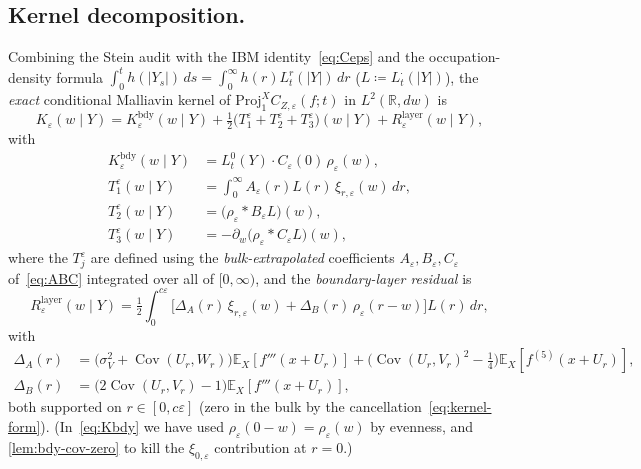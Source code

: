 \documentclass[11pt,reqno]{amsart}
\theoremstyle{plain}
\theoremstyle{definition}
\theoremstyle{remark}
\newcommand{\R}{\mathbb{R}}
\newcommand{\E}{\mathbb{E}}
\newcommand{\IBM}{Z}
\DeclareMathOperator{\Cov}{Cov}
\begin{document}
\subsection*{Kernel decomposition.}
Combining the Stein audit with the IBM identity~\eqref{eq:Ceps} and
the occupation-density formula
$\int_{0}^{t}h(|Y_{s}|)\,ds=\int_{0}^{\infty}h(r)L_{t}^{r}(|Y|)\,dr$
($L\coloneqq L_{t}^{\cdot}(|Y|)$), the \emph{exact} conditional
Malliavin kernel of $\mathrm{Proj}_{1}^{X}C_{\IBM,\varepsilon}(f;t)$
in $L^{2}(\R,dw)$ is
\begin{equation}\label{eq:Keps-decomp}
 K_{\varepsilon}(w\mid Y)
 =K_{\varepsilon}^{\mathrm{bdy}}(w\mid Y)
 +\tfrac12\bigl(T_{1}^{\varepsilon}+T_{2}^{\varepsilon}+T_{3}^{\varepsilon}\bigr)(w\mid Y)
 +R_{\varepsilon}^{\mathrm{layer}}(w\mid Y),
\end{equation}
with
\begin{align}
 K_{\varepsilon}^{\mathrm{bdy}}(w\mid Y)
 &=L_{t}^{0}(Y)\cdot C_{\varepsilon}(0)\,\rho_{\varepsilon}(w),\label{eq:Kbdy}\\
 T_{1}^{\varepsilon}(w\mid Y)
 &=\int_{0}^{\infty}A_{\varepsilon}(r)L(r)\,\xi_{r,\varepsilon}(w)\,dr,\label{eq:T1}\\
 T_{2}^{\varepsilon}(w\mid Y)
 &=\bigl(\rho_{\varepsilon}*B_{\varepsilon}L\bigr)(w),\label{eq:T2}\\
 T_{3}^{\varepsilon}(w\mid Y)
 &=-\partial_{w}\bigl(\rho_{\varepsilon}*C_{\varepsilon}L\bigr)(w),\label{eq:T3}
\end{align}
where the $T_{j}^{\varepsilon}$ are defined using the
\emph{bulk-extrapolated} coefficients $A_{\varepsilon},B_{\varepsilon},
C_{\varepsilon}$ of~\eqref{eq:ABC} integrated over all of
$[0,\infty)$, and the \emph{boundary-layer residual} is
\begin{equation}\label{eq:R-layer}
 R_{\varepsilon}^{\mathrm{layer}}(w\mid Y)
 =\tfrac12\!\int_{0}^{c\varepsilon}\!\!\bigl[\Delta_{A}(r)\,\xi_{r,\varepsilon}(w)
 +\Delta_{B}(r)\,\rho_{\varepsilon}(r-w)\bigr]L(r)\,dr,
\end{equation}
with
\begin{equation}\label{eq:DeltaAB}
\begin{aligned}
 \Delta_{A}(r)&=\bigl(\sigma_{V}^{2}+\Cov(U_{r},W_{r})\bigr)\E_{X}[f'''(x+U_{r})]
 +\bigl(\Cov(U_{r},V_{r})^{2}-\tfrac14\bigr)\E_{X}[f^{(5)}(x+U_{r})],\\
 \Delta_{B}(r)&=\bigl(2\Cov(U_{r},V_{r})-1\bigr)\E_{X}[f'''(x+U_{r})],
\end{aligned}
\end{equation}
both supported on $r\in[0,c\varepsilon]$ (zero in the bulk by the
cancellation~\eqref{eq:kernel-form}).
(In~\eqref{eq:Kbdy} we have used
$\rho_{\varepsilon}(0-w)=\rho_{\varepsilon}(w)$ by evenness, and
\cref{lem:bdy-cov-zero} to kill the $\xi_{0,\varepsilon}$
contribution at $r=0$.)
\end{document}
